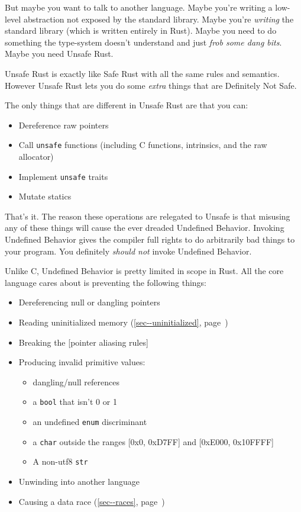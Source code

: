 \documentclass[a4paper,]{book}
\renewcommand*{\hyperlink}[2]{%
 #2 (\autoref{#1}, page~\pageref{#1})}
\providecommand{\tightlist}{%
  \setlength{\itemsep}{0pt}\setlength{\parskip}{0pt}}
\begin{document}
But maybe you want to talk to another language. Maybe you're writing a
low-level abstraction not exposed by the standard library. Maybe you're
\emph{writing} the standard library (which is written entirely in Rust).
Maybe you need to do something the type-system doesn't understand and
just \emph{frob some dang bits}. Maybe you need Unsafe Rust.

Unsafe Rust is exactly like Safe Rust with all the same rules and
semantics. However Unsafe Rust lets you do some \emph{extra} things that
are Definitely Not Safe.

The only things that are different in Unsafe Rust are that you can:

\begin{itemize}
\tightlist
\item
  Dereference raw pointers
\item
  Call \texttt{unsafe} functions (including C functions, intrinsics, and
  the raw allocator)
\item
  Implement \texttt{unsafe} traits
\item
  Mutate statics
\end{itemize}

That's it. The reason these operations are relegated to Unsafe is that
misusing any of these things will cause the ever dreaded Undefined
Behavior. Invoking Undefined Behavior gives the compiler full rights to
do arbitrarily bad things to your program. You definitely \emph{should
not} invoke Undefined Behavior.

Unlike C, Undefined Behavior is pretty limited in scope in Rust. All the
core language cares about is preventing the following things:

\begin{itemize}
\tightlist
\item
  Dereferencing null or dangling pointers
\item
  Reading \protect\hyperlink{sec--uninitialized}{uninitialized memory}
\item
  Breaking the {[}pointer aliasing rules{]}
\item
  Producing invalid primitive values:

  \begin{itemize}
  \tightlist
  \item
    dangling/null references
  \item
    a \texttt{bool} that isn't 0 or 1
  \item
    an undefined \texttt{enum} discriminant
  \item
    a \texttt{char} outside the ranges {[}0x0, 0xD7FF{]} and {[}0xE000,
    0x10FFFF{]}
  \item
    A non-utf8 \texttt{str}
  \end{itemize}
\item
  Unwinding into another language
\item
  Causing a \protect\hyperlink{sec--races}{data race}
\end{itemize}
\end{document}
